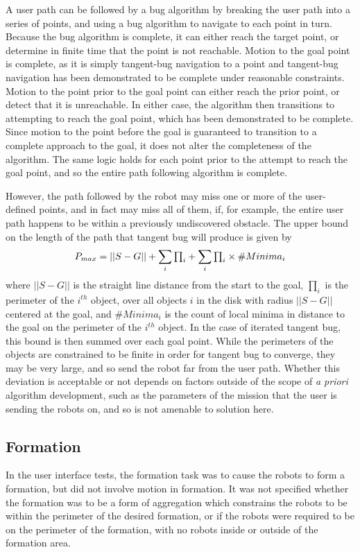 A user path can be followed by a bug algorithm by breaking the user path into a series of points, and using a bug algorithm to navigate to each point in turn. 
Because the bug algorithm is complete, it can either reach the target point, or determine in finite time that the point is not reachable. 
Motion to the goal point is complete, as it is simply tangent-bug navigation to a point and tangent-bug navigation has been demonstrated to be complete under reasonable constraints. 
Motion to the point prior to the goal point can either reach the prior point, or detect that it is unreachable. 
In either case, the algorithm then transitions to attempting to reach the goal point, which has been demonstrated to be complete.
Since motion to the point before the goal is guaranteed to transition to a complete approach to the goal, it does not alter the completeness of the algorithm. 
The same logic holds for each point prior to the attempt to reach the goal point, and so the entire path following algorithm is complete.  

However, the path followed by the robot may miss one or more of the user-defined points, and in fact may miss all of them, if, for example, the entire user path happens to be within a previously undiscovered obstacle.  
The upper bound on the length of the path that tangent bug will produce is given by 
\[P_{max} = ||S-G|| + \sum_{i}\mathsmaller{\prod_i} + \sum_{i}\mathsmaller{\prod_i} \times \#Minima_i \]
where $||S-G||$ is the straight line distance from the start to the goal, $\prod_i$ is the perimeter of the $i^{th}$ object, over all objects $i$ in the disk with radius $||S-G||$ centered at the goal, and $\#Minima_i$ is the count of local minima in distance to the goal on the perimeter of the $i^{th}$ object. 
In the case of iterated tangent bug, this bound is then summed over each goal point. 
While the perimeters of the objects are constrained to be finite in order for tangent bug to converge, they may be very large, and so send the robot far from the user path. 
Whether this deviation is acceptable or not depends on factors outside of the scope of \emph{a priori} algorithm development, such as the parameters of the mission that the user is sending the robots on, and so is not amenable to solution here. 

\subsection{Formation}

In the user interface tests, the formation task was to cause the robots to form a formation, but did not involve motion in formation. 
It was not specified whether the formation was to be a form of aggregation which constrains the robots to be within the perimeter of the desired formation, or if the robots were required to be on the perimeter of the formation, with no robots inside or outside of the formation area. 

